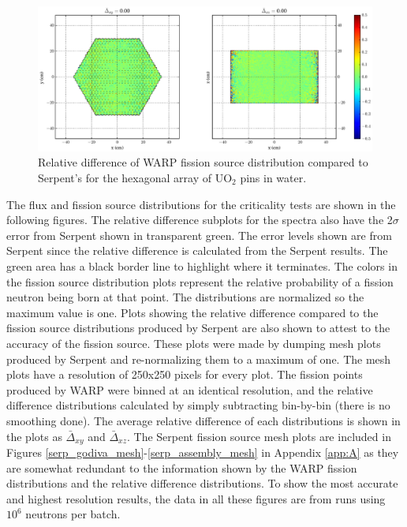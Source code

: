 \begin{figure}[h!]
\centering
\includegraphics[width=\textwidth,trim= 4cm 0cm 6cm 0cm]{graphics/finalresults/assembly_fiss_diff-6.eps}
\caption{Relative difference of WARP fission source distribution compared to Serpent's for the hexagonal array of UO$_2$ pins in water. \label{assembly_fiss_diff} }
\end{figure}


The flux and fission source distributions for the criticality tests are shown in the following figures.  The relative difference subplots for the spectra also have the 2$\sigma$ error from Serpent shown in transparent green.  The error levels shown are from Serpent since the relative difference is calculated from the Serpent results.  The green area has a black border line to highlight where it terminates.  The colors in the fission source distribution plots represent the relative probability of a fission neutron being born at that point.  The distributions are normalized so the maximum value is one.  Plots showing the relative difference compared to the fission source distributions produced by Serpent are also shown to attest to the accuracy of the fission source.  These plots were made by dumping mesh plots produced by Serpent and re-normalizing them to a maximum of one.  The mesh plots have a resolution of 250x250 pixels for every plot.  The fission points produced by WARP were binned at an identical resolution, and the relative difference distributions calculated by simply subtracting bin-by-bin (there is no smoothing done).  The average relative difference of each distributions is shown in the plots as $\bar{\Delta}_{xy}$ and $\bar{\Delta}_{xz}$.  The Serpent fission source mesh plots are included in Figures \ref{serp_godiva_mesh}-\ref{serp_assembly_mesh} in Appendix \ref{app:A} as they are somewhat redundant to the information shown by the WARP fission distributions and the relative difference distributions.  To show the most accurate and highest resolution results, the data in all these figures are from runs using $10^6$ neutrons per batch.




